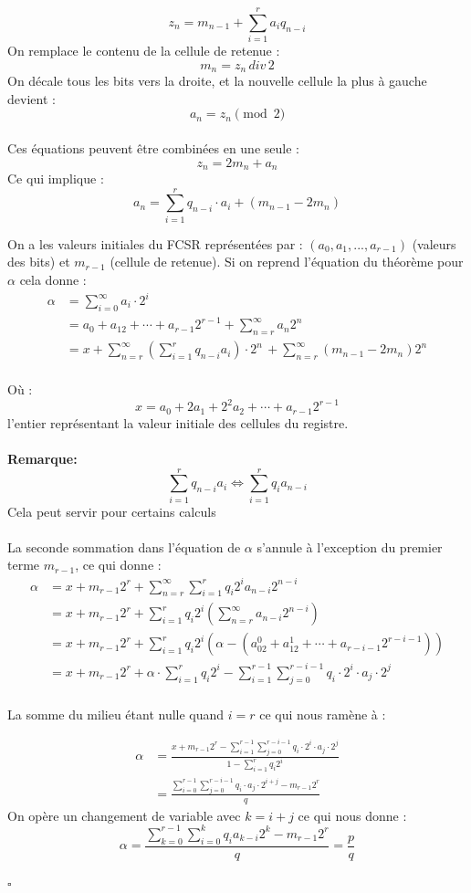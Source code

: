 \documentclass[11pt]{report}
\begin{document}
	\[
		z_n = m_{n-1} + \sum_{i=1}^{r} a_iq_{n-i}
	\]
On remplace le contenu de la cellule de retenue : $$m_n = z_n\, div\, 2$$
On décale tous les bits vers la droite, et la nouvelle cellule la plus à gauche devient : 
$$a_n = z_n \pmod{2}$$
\\
Ces équations peuvent être combinées en une seule :
$$z_n = 2m_n + a_n$$
Ce qui implique : 
$$a_n = \sum_{i=1}^r q_{n-i} \cdot a_i+(m_{n-1}-2m_n)$$

On a les valeurs initiales du FCSR représentées par : $(a_0,a_1,...,a_{r-1})$ (valeurs des bits) et $m_{r-1}$ (cellule de retenue). 
Si on reprend l'équation du théorème pour $\alpha$ cela donne :
\begin{align*}
\alpha &= \sum_{i=0}^\infty a_i \cdot 2^i\\
	&=	a_0 + a_12 + \cdots + a_{r-1}2^{r-1} + 		\sum_{n=r}^\infty a_n2^n\\
	&= x + \sum_{n=r}^\infty(\sum_{i=1}^r q_{n-i}a_i) \cdot 2^n \, + \sum_{n=r}^\infty (m_{n-1} - 2m_n)2^n\\
\end{align*}



Où :
$$ x = a_0 + 2a_1 + 2^2a_2 + \cdots + a_{r-1}2^{r-1} $$
l'entier représentant la valeur initiale des cellules du registre.
\\
\\
\textbf{Remarque:}
$$
\sum_{i=1}^r q_{n-i}a_i \Leftrightarrow \sum_{i=1}^r q_ia_{n-i}
$$
Cela peut servir pour certains calculs 
\\
\\
La seconde sommation dans l'équation de $\alpha$ s'annule à l'exception du premier terme $m_{r-1}$, ce qui donne : 
\begin{align*}
\alpha &= x + m_{r-1}2^r + \sum_{n=r}^\infty\sum_{i=1}^r q_i2^ia_{n-i}2^{n-i}\\
&= x + m_{r-1}2^r + \sum_{i=1}^r q_i2^i(\sum_{n=r}^\infty a_{n-i}2^{n-i})\\
&= x + m_{r-1}2^r + \sum_{i=1}^r q_i2^i(\alpha - (a_02^0+a_12^1 + \cdots + a_{r-i-1}2^{r-i-1}))\\
&= x + m_{r-1}2^r + \alpha \cdot \sum_{i=1}^r q_i2^i - \sum_{i=1}^{r-1}\sum_{j=0}^{r-i-1} q_i \cdot 2^i \cdot a_j \cdot 2^j\\
\end{align*}

La somme du milieu étant nulle quand $i=r$ ce qui nous ramène à :

\begin{align*}
\alpha &= \frac{x + m_{r-1}2^r - \sum_{i=1}^{r-1}\sum_{j=0}^{r-i-1} q_i \cdot 2^i \cdot a_j \cdot 2^j }{1 - \sum_{i=1}^r q_i2^i}\\
&= \frac{\sum_{i=0}^{r-1}\sum_{j=0}^{r-i-1} q_i \cdot a_j \cdot 2^{i+j} - m_{r-1}2^r}{q}
\end{align*}
On opère un changement de variable avec $k = i+j$
ce qui nous donne :
$$
\alpha = \frac{\sum_{k=0}^{r-1}\sum_{i=0}^k q_ia_{k-i}2^k - m_{r-1}2^r}{q} = \frac{p}{q} 
$$
\begin{flushright}
$\square$
\end{flushright}
\end{document}
